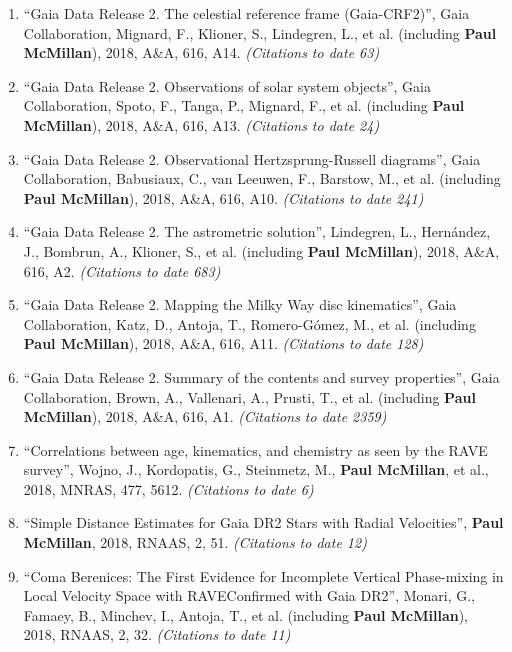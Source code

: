 \documentclass{resume}
\begin{document}
\begin{enumerate}
\item ``Gaia Data Release 2. The celestial reference frame (Gaia-CRF2)'', Gaia Collaboration, Mignard, F., Klioner, S., Lindegren, L., et al. (including \textbf{Paul McMillan}), 2018, A\&A, 616, A14. \textit{(Citations to date 63)}

\item ``Gaia Data Release 2. Observations of solar system objects'', Gaia Collaboration, Spoto, F., Tanga, P., Mignard, F., et al. (including \textbf{Paul McMillan}), 2018, A\&A, 616, A13. \textit{(Citations to date 24)}

\item ``Gaia Data Release 2. Observational Hertzsprung-Russell diagrams'', Gaia Collaboration, Babusiaux, C., van Leeuwen, F., Barstow, M., et al. (including \textbf{Paul McMillan}), 2018, A\&A, 616, A10. \textit{(Citations to date 241)}

\item ``Gaia Data Release 2. The astrometric solution'', Lindegren, L., Hern\'andez, J., Bombrun, A., Klioner, S., et al. (including \textbf{Paul McMillan}), 2018, A\&A, 616, A2. \textit{(Citations to date 683)}

\item ``Gaia Data Release 2. Mapping the Milky Way disc kinematics'', Gaia Collaboration, Katz, D., Antoja, T., Romero-G\'omez, M., et al. (including \textbf{Paul McMillan}), 2018, A\&A, 616, A11. \textit{(Citations to date 128)}

\item ``Gaia Data Release 2. Summary of the contents and survey properties'', Gaia Collaboration, Brown, A., Vallenari, A., Prusti, T., et al. (including \textbf{Paul McMillan}), 2018, A\&A, 616, A1. \textit{(Citations to date 2359)}

\item ``Correlations between age, kinematics, and chemistry as seen by the RAVE survey'', Wojno, J., Kordopatis, G., Steinmetz, M., \textbf{Paul McMillan}, et al., 2018, MNRAS, 477, 5612. \textit{(Citations to date 6)}

\item ``Simple Distance Estimates for Gaia DR2 Stars with Radial Velocities'', \textbf{Paul McMillan}, 2018, RNAAS, 2, 51. \textit{(Citations to date 12)}

\item ``Coma Berenices: The First Evidence for Incomplete Vertical Phase-mixing in Local Velocity Space with RAVE{\textemdash}Confirmed with Gaia DR2'', Monari, G., Famaey, B., Minchev, I., Antoja, T., et al. (including \textbf{Paul McMillan}), 2018, RNAAS, 2, 32. \textit{(Citations to date 11)}


\end{enumerate}
\end{document}
